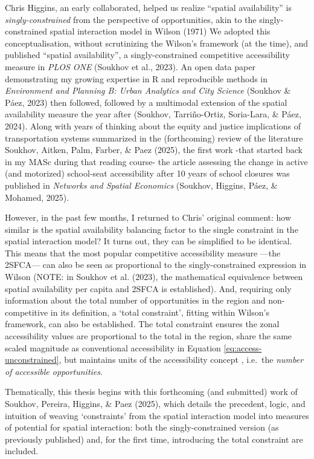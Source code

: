 \documentclass[
11pt, %
oneside, %
english, %
singlespacing, %
]{macthesis} %
\begin{document}
Chris Higgins, an early collaborated, helped us realize ``spatial availability'' is \emph{singly-constrained} from the perspective of opportunities, akin to the singly-constrained spatial interaction model in Wilson (1971) We adopted this conceptualisation, without scrutinizing the Wilson's framework (at the time), and published ``spatial availability'', a singly-constrained competitive accessibility measure in \emph{PLOS ONE} (Soukhov et al., 2023). An open data paper demonstrating my growing expertise in R and reproducible methods in \emph{Environment and Planning B: Urban Analytics and City Science} (Soukhov \& Páez, 2023) then followed, followed by a multimodal extension of the spatial availability measure the year after (Soukhov, Tarriño-Ortiz, Soria-Lara, \& Páez, 2024). Along with years of thinking about the equity and justice implications of transportation systems summarized in the (forthcoming) review of the literature Soukhov, Aitken, Palm, Farber, \& Paez (2025), the first work -that started back in my MASc during that reading course- the article assessing the change in active (and motorized) school-seat accessibility after 10 years of school closures was published in \emph{Networks and Spatial Economics} (Soukhov, Higgins, Páez, \& Mohamed, 2025).

However, in the past few months, I returned to Chris' original comment: how similar is the spatial availability balancing factor to the single constraint in the spatial interaction model? It turns out, they can be simplified to be identical. This means that the most popular competitive accessibility measure ---the 2SFCA--- can also be seen as proportional to the singly-constrained expression in Wilson (NOTE: in Soukhov et al. (2023), the mathematical equivalence between spatial availability per capita and 2SFCA is established). And, requiring only information about the total number of opportunities in the region and non-competitive in its definition, a `total constraint', fitting within Wilson's framework, can also be established. The total constraint ensures the zonal accessibility values are proportional to the total in the region, share the same scaled magnitude as conventional accessibility in Equation \ref{eq:access-unconstrained}, but maintains units of the accessibility concept , i.e.~the \emph{number of accessible opportunities}.

Thematically, this thesis begins with this forthcoming (and submitted) work of Soukhov, Pereira, Higgins, \& Paez (2025), which details the precedent, logic, and intuition of weaving `constraints' from the spatial interaction model into measures of potential for spatial interaction: both the singly-constrained version (as previously published) and, for the first time, introducing the total constraint are included.
\end{document}
